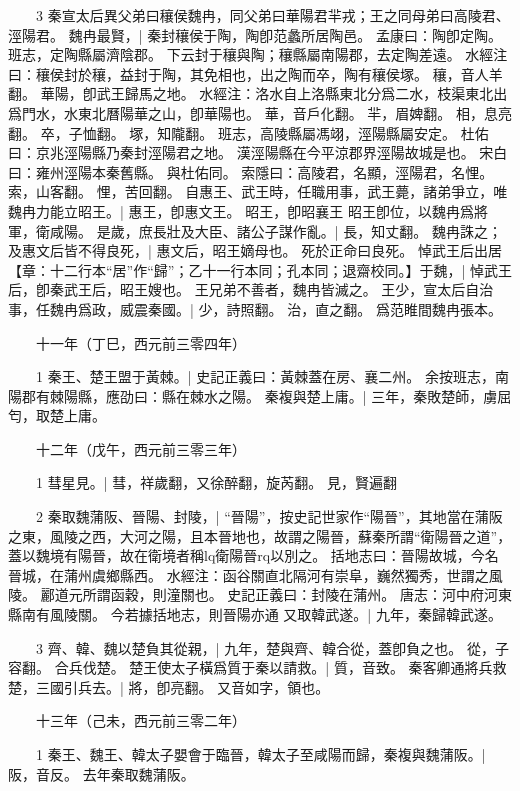 　　3 秦宣太后異父弟曰穰侯魏冉，同父弟曰華陽君羋戎；王之同母弟曰高陵君、涇陽君。
	魏冉最賢，|{
	秦封穰侯于陶，陶卽范蠡所居陶邑。
	孟康曰：陶卽定陶。
	班志，定陶縣屬濟陰郡。
	下云封于穰與陶；穰縣屬南陽郡，去定陶差遠。
	水經注曰：穰侯封於穰，益封于陶，其免相也，出之陶而卒，陶有穰侯塚。
	穰，音人羊翻。
	華陽，卽武王歸馬之地。
	水經注：洛水自上洛縣東北分爲二水，枝渠東北出爲門水，水東北曆陽華之山，卽華陽也。
	華，音戶化翻。
	羋，眉婢翻。
	相，息亮翻。
	卒，子恤翻。
	塚，知隴翻。
	班志，高陵縣屬馮翊，涇陽縣屬安定。
	杜佑曰：京兆涇陽縣乃秦封涇陽君之地。
	漢涇陽縣在今平涼郡界涇陽故城是也。
	宋白曰：雍州涇陽本秦舊縣。
	與杜佑同。
	索隱曰：高陵君，名顯，涇陽君，名悝。
	索，山客翻。
	悝，苦回翻。
}
自惠王、武王時，任職用事，武王薨，諸弟爭立，唯魏冉力能立昭王。|{
	惠王，卽惠文王。
	昭王，卽昭襄王
	}
昭王卽位，以魏冉爲將軍，衛咸陽。
	是歲，庶長壯及大臣、諸公子謀作亂。|{
	長，知丈翻。
}
魏冉誅之；及惠文后皆不得良死，|{
	惠文后，昭王嫡母也。
	死於正命曰良死。
}
悼武王后出居【章：十二行本“居”作“歸”；乙十一行本同；孔本同；退齋校同。】于魏，|{
	悼武王后，卽秦武王后，昭王嫂也。
}
王兄弟不善者，魏冉皆滅之。
	王少，宣太后自治事，任魏冉爲政，威震秦國。|{
	少，詩照翻。
	治，直之翻。
	爲范睢間魏冉張本。
}

　　十一年（丁巳，西元前三零四年）

　　1 秦王、楚王盟于黃棘。|{
	史記正義曰：黃棘蓋在房、襄二州。
	余按班志，南陽郡有棘陽縣，應劭曰：縣在棘水之陽。
}
秦複與楚上庸。|{
	三年，秦敗楚師，虜屈匄，取楚上庸。
}

　　十二年（戊午，西元前三零三年）

　　1 彗星見。|{
	彗，祥歲翻，又徐醉翻，旋芮翻。
	見，賢遍翻
	}

　　2 秦取魏蒲阪、晉陽、封陵，|{
	“晉陽”，按史記世家作“陽晉”，其地當在蒲阪之東，風陵之西，大河之陽，且本晉地也，故謂之陽晉，蘇秦所謂“衛陽晉之道”，蓋以魏境有陽晉，故在衛境者稱lq衛陽晉rq以別之。
	括地志曰：晉陽故城，今名晉城，在蒲州虞鄉縣西。
	水經注：函谷關直北隔河有崇阜，巍然獨秀，世謂之風陵。
	酈道元所謂函穀，則潼關也。
	史記正義曰：封陵在蒲州。
	唐志：河中府河東縣南有風陵關。
	今若據括地志，則晉陽亦通
	}
又取韓武遂。|{
	九年，秦歸韓武遂。
}

　　3 齊、韓、魏以楚負其從親，|{
	九年，楚與齊、韓合從，蓋卽負之也。
	從，子容翻。
}
合兵伐楚。
	楚王使太子橫爲質于秦以請救。|{
	質，音致。
}
秦客卿通將兵救楚，三國引兵去。|{
	將，卽亮翻。
	又音如字，領也。
}

　　十三年（己未，西元前三零二年）

　　1 秦王、魏王、韓太子嬰會于臨晉，韓太子至咸陽而歸，秦複與魏蒲阪。|{
	阪，音反。
	去年秦取魏蒲阪。
}

